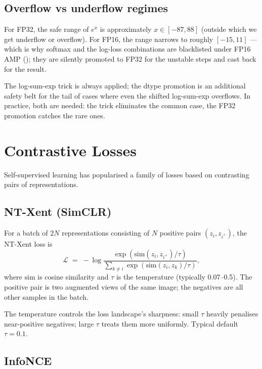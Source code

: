 \subsection{Overflow vs underflow regimes}
\label{ssec:losses:overflow_underflow}

For FP32, the safe range of $e^x$ is approximately
$x \in [-87, 88]$ (outside which we get underflow or overflow).
For FP16, the range narrows to roughly $[-15, 11]$ --- which is
why softmax and the log-loss combinations are blacklisted
under FP16 AMP (); they are silently promoted
to FP32 for the unstable steps and cast back for the result.

The log-sum-exp trick is always applied; the dtype promotion is
an additional safety belt for the tail of cases where even the
shifted log-sum-exp overflows. In practice, both are needed:
the trick eliminates the common case, the FP32 promotion
catches the rare ones.

\section{Contrastive Losses}
\label{sec:losses:contrastive}

Self-supervised learning has popularised a family of losses
based on contrasting pairs of representations.

\subsection{NT-Xent (SimCLR)}
\label{ssec:losses:nt_xent}

For a batch of $2N$ representations consisting of $N$ positive
pairs $(z_i, z_{i^+})$, the NT-Xent loss is
\[
  \mathcal{L} \;=\;
  -\log \frac{\exp(\mathrm{sim}(z_i, z_{i^+}) / \tau)}
              {\sum_{k \neq i} \exp(\mathrm{sim}(z_i, z_k) / \tau)},
\]
where $\mathrm{sim}$ is cosine similarity and $\tau$ is the
temperature (typically 0.07--0.5). The positive pair is two
augmented views of the same image; the negatives are all other
samples in the batch.

The temperature controls the loss landscape's sharpness: small
$\tau$ heavily penalises near-positive negatives; large $\tau$
treats them more uniformly. Typical default $\tau = 0.1$.

\subsection{InfoNCE}
\label{ssec:losses:infonce}

